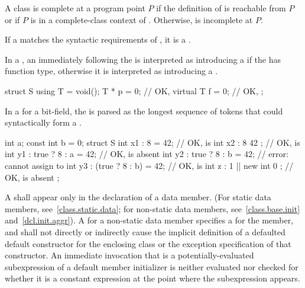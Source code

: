 \pnum
A class  is complete at a program point $P$
if the definition of  is reachable from $P$
or if $P$ is in a complete-class context of .
Otherwise,  is incomplete at $P$.

\pnum
If a  matches
the syntactic requirements of ,
it is a .

\pnum
In a ,
an \tcode{=} immediately following the 
is interpreted as introducing a 
if the  has function type,
otherwise it is interpreted as introducing
a .
\begin{example}
\begin{codeblock}
struct S {
  using T = void();
  T * p = 0;        // OK, 
  virtual T f = 0;  // OK, 
};
\end{codeblock}
\end{example}

\pnum
In a  for a bit-field,
the  is parsed as
the longest sequence of tokens
that could syntactically form a .
\begin{example}
\begin{codeblock}
int a;
const int b = 0;
struct S {
  int x1 : 8 = 42;              // OK,  is 
  int x2 : 8 { 42 };            // OK,  is 
  int y1 : true ? 8 : a = 42;   // OK,  is absent
  int y2 : true ? 8 : b = 42;   // error: cannot assign to 
  int y3 : (true ? 8 : b) = 42; // OK,  is 
  int z : 1 || new int { 0 };   // OK,  is absent
};
\end{codeblock}
\end{example}

\pnum
A  shall appear only in the
declaration of a data member. (For static data members,
see~\ref{class.static.data}; for non-static data members,
see~\ref{class.base.init} and~\ref{dcl.init.aggr}).
A  for a non-static data member
%
specifies a  for the member, and
shall not directly or indirectly cause the implicit definition of a
defaulted default constructor for the enclosing class or the
exception specification of that constructor.
An immediate invocation that
is a potentially-evaluated subexpression
of a default member initializer
is neither evaluated nor checked for whether it
is a constant expression at the point where the subexpression appears.

